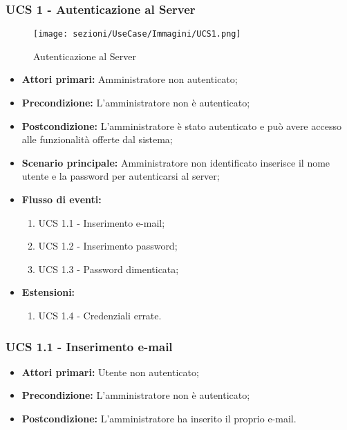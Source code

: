 \subsubsection{UCS 1 - Autenticazione al Server}
\begin{figure}[h]
    \centering
    \texttt{[image: sezioni/UseCase/Immagini/UCS1.png]}
    \caption{Autenticazione al Server}
\end{figure}

\begin{itemize}
\item \textbf{Attori primari:} Amministratore non autenticato;
\item \textbf{Precondizione:} L'amministratore non è autenticato;
\item \textbf{Postcondizione:} L'amministratore è stato autenticato e può avere accesso alle funzionalità offerte dal sistema;
\item \textbf{Scenario principale:} Amministratore non identificato inserisce il nome utente e la password per autenticarsi al server;
\item \textbf{Flusso di eventi:}
    \begin{enumerate}
        \item UCS 1.1 - Inserimento e-mail;
        \item UCS 1.2 - Inserimento password;
        \item UCS 1.3 - Password dimenticata;
    \end{enumerate}
\item \textbf{Estensioni:}
	\begin{enumerate}		
		\item UCS 1.4 - Credenziali errate.
	\end{enumerate}
\end{itemize}

\subsubsection{UCS 1.1 - Inserimento e-mail}%
\begin{itemize}
\item \textbf{Attori primari:} Utente non autenticato;
\item \textbf{Precondizione:} L'amministratore non è autenticato;
\item \textbf{Postcondizione:} L'amministratore ha inserito il proprio e-mail.
\end{itemize}


